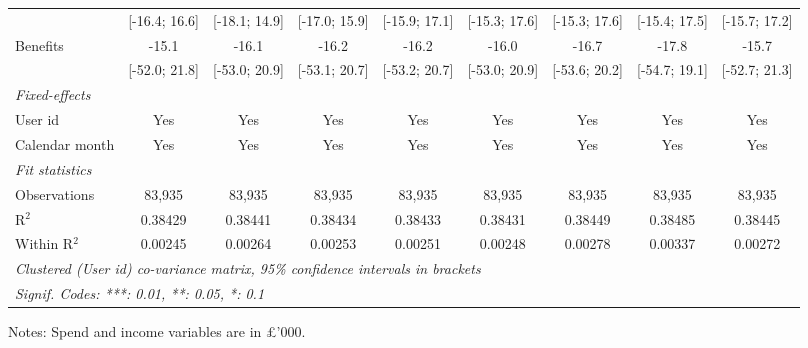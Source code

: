 \begin{table}[htbp]
\begin{threeparttable}[b]
\begin{tabular}{lcccccccc}
                                     & [-16.4; 16.6]   & [-18.1; 14.9]   & [-17.0; 15.9]   & [-15.9; 17.1]   & [-15.3; 17.6]   & [-15.3; 17.6]   & [-15.4; 17.5]   & [-15.7; 17.2]\\   
         Benefits                    & -15.1           & -16.1           & -16.2           & -16.2           & -16.0           & -16.7           & -17.8           & -15.7\\   
                                     & [-52.0; 21.8]   & [-53.0; 20.9]   & [-53.1; 20.7]   & [-53.2; 20.7]   & [-53.0; 20.9]   & [-53.6; 20.2]   & [-54.7; 19.1]   & [-52.7; 21.3]\\   
         \midrule
         \emph{Fixed-effects}\\
         User id                     & Yes             & Yes             & Yes             & Yes             & Yes             & Yes             & Yes             & Yes\\  
         Calendar month              & Yes             & Yes             & Yes             & Yes             & Yes             & Yes             & Yes             & Yes\\  
         \midrule
         \emph{Fit statistics}\\
         Observations                & 83,935          & 83,935          & 83,935          & 83,935          & 83,935          & 83,935          & 83,935          & 83,935\\  
         R$^2$                       & 0.38429         & 0.38441         & 0.38434         & 0.38433         & 0.38431         & 0.38449         & 0.38485         & 0.38445\\  
         Within R$^2$                & 0.00245         & 0.00264         & 0.00253         & 0.00251         & 0.00248         & 0.00278         & 0.00337         & 0.00272\\  
         \midrule \midrule
         \multicolumn{9}{l}{\emph{Clustered (User id) co-variance matrix, 95\% confidence intervals in brackets}}\\
         \multicolumn{9}{l}{\emph{Signif. Codes: ***: 0.01, **: 0.05, *: 0.1}}\\
      \end{tabular}
      
      \begin{tablenotes}\footnotesize
         \item Notes: Spend and income variables are in \pounds'000.
      \end{tablenotes}
   \end{threeparttable}
\end{table}


